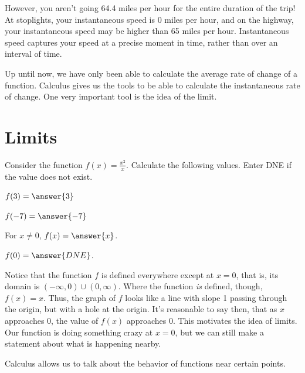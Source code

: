 \documentclass{ximera}
\begin{document}
However, you aren't going 64.4 miles per hour for the entire duration of the trip! At stoplights, your instantaneous speed is 0 miles per hour, and on the highway, your instantaneous speed may be higher than 65 miles per hour. Instantaneous speed captures your speed at a precise moment in time, rather than over an interval of time. 

Up until now, we have only been able to calculate the average rate of change of a function. Calculus gives us the tools to be able to calculate the instantaneous rate of change. One very important tool is the idea of the limit. 

\section{Limits}
\begin{problem}
Consider the function $f(x) = \frac{x^2}{x}$. Calculate the following values. Enter DNE if the value does not exist.

$f(3) = \answer{3}$

$f(-7) = \answer{-7}$

For $x \ne 0$, $f(x) = \answer{x}$.

$f(0) = \answer{DNE}$.
\end{problem}

Notice that the function $f$ is defined everywhere except at $x = 0$, that is, its domain is $(-\infty, 0) \cup (0, \infty)$. Where the function \emph{is} defined, though, $f(x) = x$. Thus, the graph of $f$ looks like a line with slope 1 passing through the origin, but with a hole at the origin. It's reasonable to say then, that as $x$ approaches 0, the value of $f(x)$ approaches 0. This motivates the idea of limits. Our function is doing something crazy at $x = 0$, but we can still make a statement about what is happening nearby. 

Calculus allows us to talk about the behavior of functions near certain points. 
\end{document}
